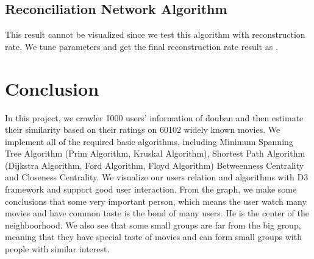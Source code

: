\documentclass{article}
\begin{document}
\subsection{Reconciliation Network Algorithm}
This result cannot be visualized since we test this algorithm with reconstruction rate. We tune parameters and get the final reconstruction rate result as .
 
\section{Conclusion}
In this project, we crawler 1000 users' information of douban and then estimate their similarity based on their ratings on 60102 widely known movies. We implement all of the required basic algorithms, including Minimum Spanning Tree Algorithm (Prim Algorithm, Kruskal Algorithm), Shortest Path Algorithm (Dijkstra Algorithm, Ford Algorithm, Floyd Algorithm) Betweenness Centrality and Closeness Centrality. We visualize our users relation and algorithms with D3 framework and support good user interaction. From the graph, we make some conclusions that some very important person, which means the user watch many movies and have common taste is the bond of many users. He is the center of the neighboorhood. We also see that some small groups are far from the big group, meaning that they have special taste of movies and can form small groups with people with similar interest.

\begin{small}

 
\end{small}

\medskip
\end{document}
